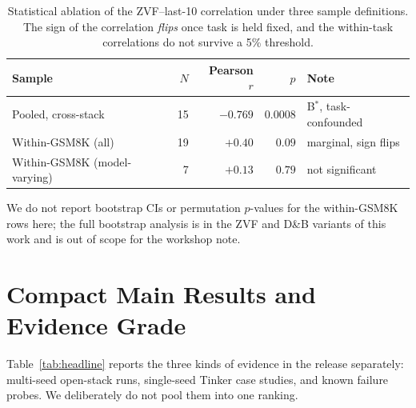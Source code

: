 \documentclass{article}
\begin{document}
\begin{table}[htbp]
\centering\small
\setlength{\tabcolsep}{5pt}
\caption{Statistical ablation of the ZVF--last-10 correlation under three
sample definitions. The sign of the correlation \emph{flips} once task is
held fixed, and the within-task correlations do not survive a 5\%
threshold.}
\label{tab:zvf-stat-ablation}
\begin{tabular}{@{}l r r r l@{}}
\toprule
\textbf{Sample} & \textbf{$N$} & \textbf{Pearson $r$} & \textbf{$p$} & \textbf{Note} \\
\midrule
Pooled, cross-stack          & 15 & $-0.769$ & $0.0008$ & B$^{*}$, task-confounded \\
Within-GSM8K (all)           & 19 & $+0.40$  & $0.09$   & marginal, sign flips \\
Within-GSM8K (model-varying) &  7 & $+0.13$  & $0.79$   & not significant \\
\bottomrule
\end{tabular}
\end{table}

\noindent
We do not report bootstrap CIs or permutation $p$-values for the
within-GSM8K rows here; the full bootstrap analysis is in the ZVF and
D\&B variants of this work and is out of scope for the workshop note.

\section{Compact Main Results and Evidence Grade}
\label{sec:main_results}
\label{sec:results}


Table~\ref{tab:headline} reports the three kinds of evidence in the release
separately: multi-seed open-stack runs, single-seed Tinker case studies, and
known failure probes. We deliberately do not pool them into one ranking.
\end{document}
